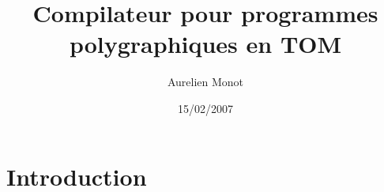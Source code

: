 \documentclass[a4paper,11pt,titlepage]{article}
\title{Compilateur pour programmes polygraphiques en TOM}
\author{Aurelien Monot}
\date{15/02/2007}
\begin{document}
\maketitle
\tableofcontents

\newpage 
\section{Introduction}
\end{document}
